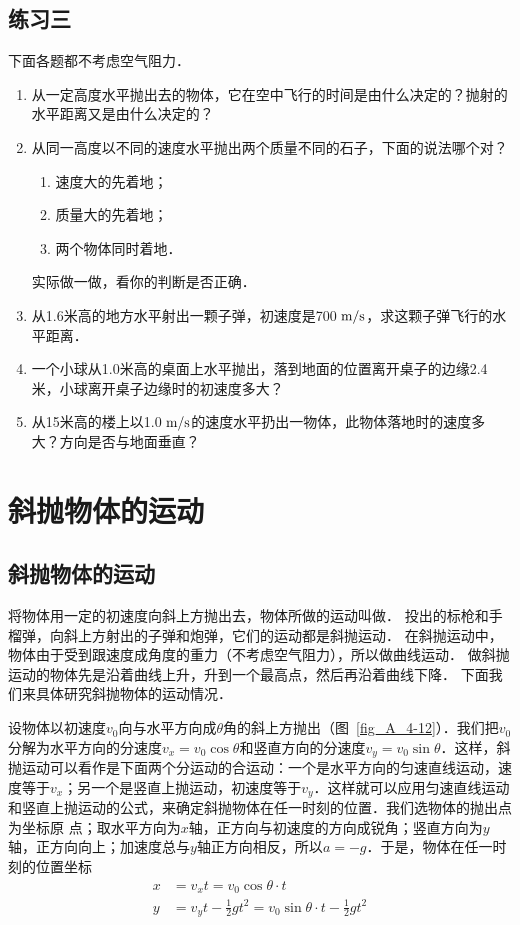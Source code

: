 \subsection*{练习三}


下面各题都不考虑空气阻力．
\begin{enumerate}
\item 从一定高度水平抛出去的物体，它在空中飞行的时间是由什么决定的？抛射的水平距离又是由什么决定的？
\item 从同一高度以不同的速度水平抛出两个质量不同的石子，下面的说法哪个对？
\begin{enumerate}
    \item 速度大的先着地；
    \item  质量大的先着地；
    \item 两个物体同时着地．
\end{enumerate}
实际做一做，看你的判断是否正确．

\item 从1.6米高的地方水平射出一颗子弹，初速度是700$\;\text{m}/\text{s}$，求这颗子弹飞行的水平距离．
\item 一个小球从1.0米高的桌面上水平抛出，落到地面的位置离开桌子的边缘2.4米，小球离开桌子边缘时的初速度多大？
\item 从15米高的楼上以1.0$\;\text{m}/\text{s}$的速度水平扔出一物体，此物体落地时的速度多大？方向是否与地面垂直？

\end{enumerate}


\section{斜抛物体的运动}
\subsection{斜抛物体的运动} 

将物体用一定的初速度向斜上方抛出去，物体所做的运动叫做．
投出的标枪和手榴弹，向斜上方射出的子弹和炮弹，它们的运动都是斜抛运动．
在斜抛运动中，物体由于受到跟速度成角度的重力（不考虑空气阻力），所以做曲线运动．
做斜抛运动的物体先是沿着曲线上升，升到一个最高点，然后再沿着曲线下降．
下面我们来具体研究斜抛物体的运动情况．

设物体以初速度$v_0$向与水平方向成$\theta$角的斜上方抛出（图~\ref{fig_A_4-12}）．我们把$v_0$分解为水平方向的分速度$v_x=v_0\cos\theta$和竖直方向的分速度$v_y=v_0\sin\theta$．这样，斜抛运动可以看作是下面两个分运动的合运动：一个是水平方向的匀速直线运动，速度等于$v_x$；另一个是竖直上抛运动，初速度等于$v_y$．这样就可以应用匀速直线运动和竖直上抛运动的公式，来确定斜抛物体在任一时刻的位置．我们选物体的抛出点为坐标原
点；取水平方向为$x$轴，正方向与初速度的方向成锐角；竖直方向为$y$轴，正方向向上；加速度总与$y$轴正方向相反，所以$a=-g$．于是，物体在任一时刻的位置坐标
\[\begin{split}
x&=v_x t=v_0\cos\theta \cdot t\\
y&=v_y t-\frac{1}{2}gt^2=v_0\sin\theta \cdot t-\frac{1}{2}gt^2
\end{split} \]

